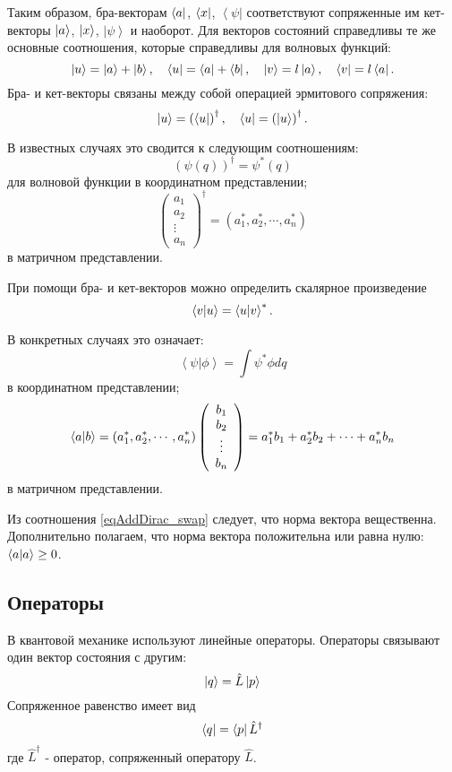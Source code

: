 Таким образом, бра-векторам
$\bra{ a }$,  $\bra{ x }$, $\left< \psi \right|$
соответствуют сопряженные им кет-векторы  
$\ket{ a }$,  $\ket{ x }$, $\left| \psi \right>$
и наоборот. Для векторов состояний справедливы те же основные
соотношения, которые справедливы для волновых функций:  
\begin{equation}
\ket{ u } = \ket{ a }  + \ket{ b }, \quad 
\bra{ u } = \bra{ a }  + \bra{ b }, \quad 
\ket{ v } = l \ket{ a }, \quad  
\bra{ v } = l \bra{ a }.
\end{equation}
Бра- и кет-векторы связаны между собой операцией эрмитового 
сопряжения:
\begin{equation}
\ket{ u } = \left( \bra{ u } \right)^{\dag}, \quad 
\bra{ u } = \left( \ket{ u } \right)^{\dag}.
\end{equation}

В известных случаях это сводится к следующим соотношениям:
\[
\left( \psi\left( q \right) \right)^{\dag} = \psi^{*}\left( q \right)
\]
для волновой функции в координатном представлении;
\[
\left(
\begin{array} {c} 
a_1 \\
a_2 \\
\vdots \\
a_n
\end{array}
 \right)^{\dag} = 
\left( a_1^{*}, a_2^{*}, \cdots, a_n^{*}\right)
\]
в матричном представлении.

При помощи бра- и кет-векторов можно определить скалярное 
произведение
\begin{equation}
\bra{ v }\ket{ u } = \bra{ u }\ket{ v }^{*}.
\label{eqAddDirac_swap}
\end{equation}

В конкретных случаях это означает:
\[
\left< \psi \right|\left. \phi \right> = 
\int \psi^{*} \phi dq
\]
в координатном представлении;
\[
\bra{ a }\ket{ b } = 
\left( a_1^{*}, a_2^{*}, \cdots, a_n^{*}\right) 
\left(
\begin{array} {c} 
b_1 \\
b_2 \\
\vdots \\
b_n
\end{array}
 \right) = 
a_1^{*} b_1 +  a_2^{*} b_2 + \cdots + a_n^{*} b_n
\]
в матричном представлении.

Из соотношения \eqref{eqAddDirac_swap} следует, что норма вектора
вещественна. Дополнительно полагаем, что норма вектора положительна
или равна нулю: 
$\bra{ a }\ket{ a } \geq 0$.

\subsection{Операторы}
В квантовой механике используют линейные операторы. Операторы
связывают один вектор состояния с другим: 
\begin{equation}
\ket{ q } = \hat{L}\ket{ p }
\label{eqAddDirac_operator_property1}
\end{equation}
Сопряженное равенство имеет вид
\begin{equation}
\bra{ q } = \bra{ p }  \hat{L}^{\dag}
\label{eqAddDirac_operator_property2}
\end{equation}
где $\hat{L}^{\dag}$ -  оператор, сопряженный оператору $\hat{L}$.

